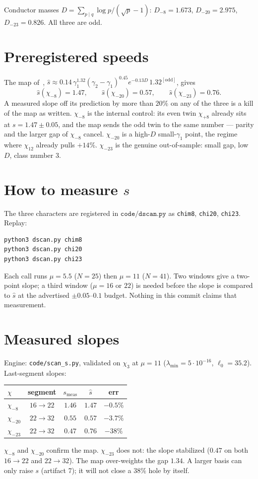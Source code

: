 \documentclass[10pt]{article}
\begin{document}
Conductor masses $D=\sum_{p\mid q}\log p/(\sqrt p-1)$:
$D_{-8}=1.673$, $D_{-20}=2.975$, $D_{-23}=0.826$. All three are odd.

\section{Preregistered speeds}

The map of~\cite{Depth},
$\hat s\approx0.14\,\gamma_1^{1.32}(\gamma_2-\gamma_1)^{0.45}
e^{-0.13 D}\,1.32^{[\mathrm{odd}]}$, gives
\[
\hat s(\chi_{-8})=1.47,\qquad
\hat s(\chi_{-20})=0.57,\qquad
\hat s(\chi_{-23})=0.76.
\]
A measured slope off its prediction by more than $20\%$ on any of the
three is a kill of the map as written. $\chi_{-8}$ is the internal
control: its even twin $\chi_{+8}$ already sits at $s=1.47\pm0.05$,
and the map sends the odd twin to the same number --- parity and the
larger gap of $\chi_{-8}$ cancel. $\chi_{-20}$ is a high-$D$ small-$\gamma_1$
point, the regime where $\chi_{12}$ already pulls $+14\%$.
$\chi_{-23}$ is the genuine out-of-sample: small gap, low $D$, class
number $3$.

\section{How to measure $s$}

The three characters are registered in $\mathtt{code/dscan.py}$ as
\texttt{chim8}, \texttt{chi20}, \texttt{chi23}. Replay:
\begin{verbatim}
python3 dscan.py chim8
python3 dscan.py chi20
python3 dscan.py chi23
\end{verbatim}
Each call runs $\mu=5.5$ ($N=25$) then $\mu=11$ ($N=41$). Two windows
give a two-point slope; a third window ($\mu=16$ or $22$) is needed
before the slope is compared to $\hat s$ at the advertised
$\pm0.05$--$0.1$ budget. Nothing in this commit claims that
measurement.


\section{Measured slopes}

Engine: \texttt{code/scan\_s.py}, validated on $\chi_3$ at $\mu=11$
($\lambda_{\min}=5\cdot10^{-16}$, $\ell_0=35.2$). Last-segment slopes:

\begin{center}\small
\begin{tabular}{lcccc}
\toprule
$\chi$ & segment & $s_{\mathrm{meas}}$ & $\hat s$ & err \\
\midrule
$\chi_{-8}$  & $16\to22$ & $1.46$ & $1.47$ & $-0.5\%$ \\
$\chi_{-20}$ & $22\to32$ & $0.55$ & $0.57$ & $-3.7\%$ \\
$\chi_{-23}$ & $22\to32$ & $0.47$ & $0.76$ & $-38\%$ \\
\bottomrule
\end{tabular}
\end{center}
$\chi_{-8}$ and $\chi_{-20}$ confirm the map. $\chi_{-23}$ does not:
the slope stabilized ($0.47$ on both $16\to22$ and $22\to32$). The map
over-weights the gap $1.34$. A larger basis can only raise $s$
(artifact 7); it will not close a $38\%$ hole by itself.
\end{document}
